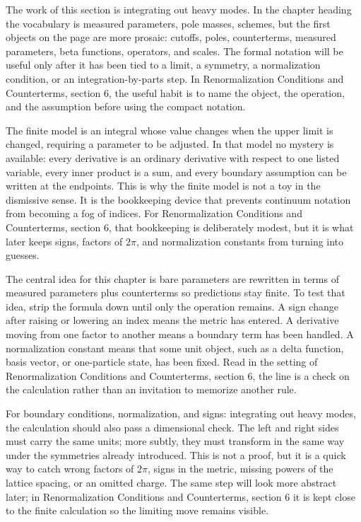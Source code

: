 The work of this section is integrating out heavy modes.  In the chapter heading the vocabulary is measured parameters, pole masses, schemes, but the first objects on the page are more prosaic: cutoffs, poles, counterterms, measured parameters, beta functions, operators, and scales.  The formal notation will be useful only after it has been tied to a limit, a symmetry, a normalization condition, or an integration-by-parts step.  In Renormalization Conditions and Counterterms, section 6, the useful habit is to name the object, the operation, and the assumption before using the compact notation.

The finite model is an integral whose value changes when the upper limit is changed, requiring a parameter to be adjusted.  In that model no mystery is available: every derivative is an ordinary derivative with respect to one listed variable, every inner product is a sum, and every boundary assumption can be written at the endpoints.  This is why the finite model is not a toy in the dismissive sense.  It is the bookkeeping device that prevents continuum notation from becoming a fog of indices.  For Renormalization Conditions and Counterterms, section 6, that bookkeeping is deliberately modest, but it is what later keeps signs, factors of \(2\pi\), and normalization constants from turning into guesses.

The central idea for this chapter is bare parameters are rewritten in terms of measured parameters plus counterterms so predictions stay finite.  To test that idea, strip the formula down until only the operation remains.  A sign change after raising or lowering an index means the metric has entered.  A derivative moving from one factor to another means a boundary term has been handled.  A normalization constant means that some unit object, such as a delta function, basis vector, or one-particle state, has been fixed.  Read in the setting of Renormalization Conditions and Counterterms, section 6, the line is a check on the calculation rather than an invitation to memorize another rule.

For boundary conditions, normalization, and signs: integrating out heavy modes, the calculation should also pass a dimensional check.  The left and right sides must carry the same units; more subtly, they must transform in the same way under the symmetries already introduced.  This is not a proof, but it is a quick way to catch wrong factors of \(2\pi\), signs in the metric, missing powers of the lattice spacing, or an omitted charge.  The same step will look more abstract later; in Renormalization Conditions and Counterterms, section 6 it is kept close to the finite calculation so the limiting move remains visible.

